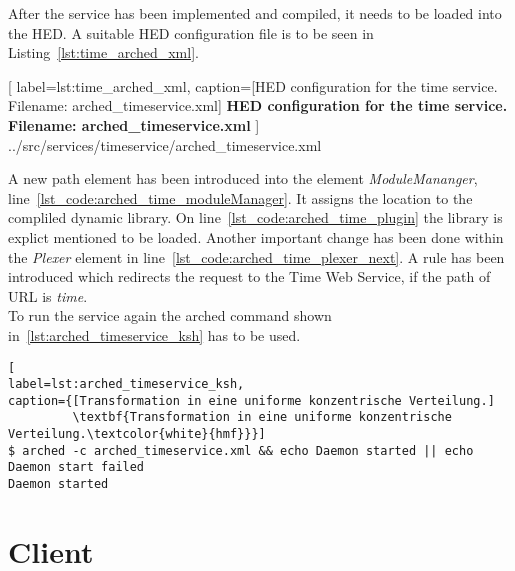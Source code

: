 After the service has been implemented and compiled, it needs to be loaded into the HED. A suitable HED configuration file is to be seen in Listing~\ref{lst:time_arched_xml}. 
\begin{program}

	[
	label=lst:time_arched_xml,
	caption={[HED configuration for the time service. Filename: arched\_timeservice.xml]
	\textbf{HED configuration for the time service. Filename: arched\_timeservice.xml}}
	]
{../src/services/timeservice/arched_timeservice.xml}
\end{program}
A new path element has been introduced into the element \textit{ModuleMananger}, line~\ref{lst_code:arched_time_moduleManager}. It assigns the location to the compliled dynamic library. 
On line~\ref{lst_code:arched_time_plugin} the library is explict mentioned to be loaded.
Another important change has been done within the \textit{Plexer} element in line~\ref{lst_code:arched_time_plexer_next}. A rule has been introduced which redirects the request to the Time Web Service, if the path of URL is \textit{time}.\\


To run the service again the arched command shown in~\ref{lst:arched_timeservice_ksh} has to be used.
\begin{program}
\begin{lstlisting}[
label=lst:arched_timeservice_ksh,
caption={[Transformation in eine uniforme konzentrische Verteilung.]
         \textbf{Transformation in eine uniforme konzentrische Verteilung.\textcolor{white}{hmf}}}]
$ arched -c arched_timeservice.xml && echo Daemon started || echo Daemon start failed
Daemon started
\end{lstlisting}
\end{program}



\section{Client}

